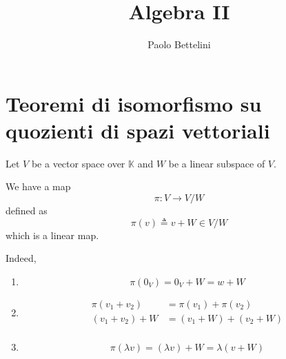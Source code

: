 \documentclass[a4paper]{article}
\title{Algebra II}
\author{Paolo Bettelini}
\date{}
\begin{document}
\maketitle
\tableofcontents

\section{Teoremi di isomorfismo su quozienti di spazi vettoriali}

Let \(V\) be a vector space over \(\mathbb{K}\)
and \(W\) be a linear subspace of \(V\).

We have a map
\[
    \pi \colon V \to V/W
\]
defined as
\[
    \pi(v) \triangleq v + W \in V/W
\]
which is a linear map.

Indeed,
\begin{enumerate}
    \item \[
        \pi(0_V) = 0_V + W = w + W
    \]
    \item \begin{align*}
        \pi(v_1 + v_2) &= \pi(v_1) + \pi(v_2) \\
        (v_1 + v_2) + W &= (v_1 + W) + (v_2 + W) \\
    \end{align*}
    \item \[
        \pi(\lambda v) = (\lambda v) + W = \lambda \left(v + W\right)
    \]
\end{enumerate}
\end{document}
